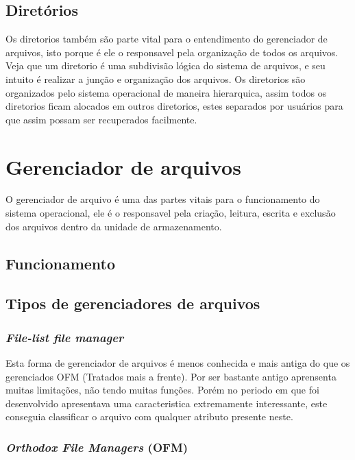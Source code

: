 \documentclass[12pt,a4paper,openany,oneside]{abntex2}
\begin{document}
\subsection{Diretórios}

Os diretorios também são parte vital para o entendimento do gerenciador de arquivos, isto porque é ele o responsavel pela organização de todos os arquivos. Veja que um diretorio é uma subdivisão lógica do sistema de arquivos, e seu intuito é  realizar a junção e organização dos arquivos.
Os diretorios são organizados pelo sistema operacional de maneira hierarquica, assim todos os diretorios ficam alocados em outros diretorios, estes separados por usuários para que assim possam ser recuperados facilmente.

\section{Gerenciador de arquivos}

O gerenciador de arquivo é uma das partes vitais para o funcionamento do sistema operacional, ele é o responsavel pela criação, leitura, escrita e exclusão dos arquivos dentro da unidade de armazenamento.

\subsection{Funcionamento}


\subsection{Tipos de gerenciadores de arquivos}


\subsubsection{\textit{File-list file manager}}

Esta forma de gerenciador de arquivos é menos conhecida e mais antiga do que os gerenciados OFM  (Tratados mais a frente). Por ser bastante antigo aprensenta muitas limitações, não tendo muitas funções. Porém no periodo em que foi desenvolvido apresentava uma caracteristica extremamente interessante, este conseguia classificar o arquivo com qualquer atributo presente neste.

\subsubsection{\textit{Orthodox File Managers} (OFM)}
\end{document}
